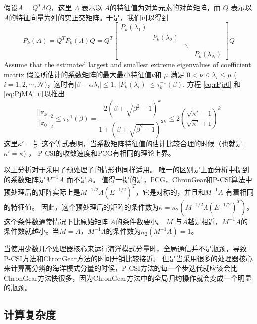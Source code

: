 假设$A= Q^T\Lambda Q$，这里 $\Lambda$ 表示以  $A$的特征值为对角元素的对角矩阵，而 $Q$ 表示以  $A$的特征向量为列的实正交矩阵。于是，我们可以得到
\begin{equation}
P_k(A) = Q^T P_k(\Lambda)Q = Q^T \left [\begin{array}{cccc}
P_k(\lambda_1) & & &\\
& P_k(\lambda_2) & &\\
& & \ddots &\\
 & & & P_k(\lambda_N)
\end{array} \right ] Q \label{eq:PjMA}
\end{equation}
Assume that the estimated largest and smallest extreme eigenvalues of coefficient matrix 
假设所估计的系数矩阵的最大最小特征值$\nu$和 $\mu$ 满足 $0 < \nu \le \lambda_i \le \mu$ ($i = 1, 2, \cdots, \mathcal{N}$)，这时有$|\beta - \alpha \lambda_i| \le 1$, $|P_k(\lambda_i)| \le \tau^{-1}_k (\beta)$.
方程 \ref{eq:rPjr0} 和 \ref{eq:PjMA} 可以推出
\begin{equation}
\label{pcsi_convergence}
\frac{||\textbf{r}_k||_2}{||\textbf{r}_0||_2}  \le  \tau_k^{-1}(\beta) = \frac{2(\beta+\sqrt{\beta^2-1})^k}{1+(\beta+\sqrt{\beta^2-1})^{2k}} \le 2(\frac{\sqrt{\kappa'}-1}{\sqrt{\kappa'}+1})^k
\end{equation}
这里$\kappa' = \frac{\mu}{\nu}$.
 这个等式表明，当系数矩阵特征值的估计比较合理的时候（也就是$\kappa' =\kappa$) ， P-CSI的收敛速度和PCG有相同的理论上界。


 
以上分析对于采用了预处理子的情形也同样适用。
唯一的区别是上面分析中提到的系数矩阵是$M^{-1}A$ 而不是$A$。
值得一提的是，PCG，ChronGear和P-CSI算法中预处理后的矩阵实际上是$M^{-1/2}A(E^{-1/2})^T$，它是对称的，并且和$M^{-1}A$ 有着相同的特征值\cite{Shewchuk1994}。
因此，这个预处理后的矩阵的条件数为$\kappa =  \kappa_2(M^{-1/2}A(E^{-1/2})^T)$。这个条件数通常情况下比原始矩阵 $A$的条件数要小。 
 $M$ 与$A$越是相近，$M^{-1}A$的条件数就越小。当$M = A$，$M^{-1}A$的条件数为$\kappa_2(M^{-1 }A ) = 1$。 

 当使用少数几个处理器核心来运行海洋模式分量时，全局通信并不是瓶颈，导致P-CSI方法和ChronGear方法的时间开销比较接近。
但是当采用很多的处理器核心来计算高分辨的海洋模式分量的时候，P-CSI方法的每一个步迭代就应该会比ChronGear方法快很多，因为ChronGear方法中的全局归约操作就会变成一个明显的瓶颈。

\subsection{计算复杂度}  \label{solver:Algorithm:complex}



